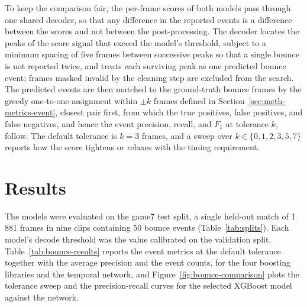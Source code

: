 To keep the comparison fair, the per-frame scores of both models pass through
one shared decoder, so that any difference in the reported
events is a difference between the scores and not between the post-processing. The
decoder locates the peaks of the score signal that exceed the model's threshold, subject to a minimum spacing of five frames between successive peaks so
that a single bounce is not reported twice, and treats each surviving peak as one
predicted bounce event; frames masked invalid by the cleaning step are excluded
from the search. The predicted events are then matched to the ground-truth bounce
frames by the greedy one-to-one assignment within $\pm k$ frames defined in
Section~\ref{sec:meth-metrics-event}, closest pair first, from which the true
positives, false positives, and false negatives, and hence the event precision,
recall, and $F_1$ at tolerance $k$, follow. The default tolerance is $k = 3$
frames, and a sweep over $k \in \{0, 1, 2, 3, 5, 7\}$ reports how the score
tightens or relaxes with the timing requirement.

\section{Results}
\label{sec:bounce-results}

The models were evaluated on the game7 test split, a single held-out match
of 1\,881 frames in nine clips containing 50 bounce events
(Table~\ref{tab:splits}). Each model's decode threshold was the value calibrated on
the validation split. Table~\ref{tab:bounce-results} reports the event metrics at
the default tolerance together with the average precision and the event counts, for
the four boosting libraries and the temporal network, and
Figure~\ref{fig:bounce-comparison} plots the tolerance sweep and the
precision-recall curves for the selected XGBoost model against the network.

